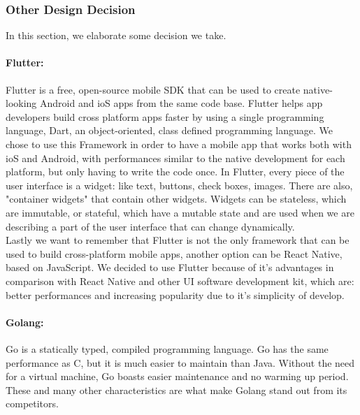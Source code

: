 \subsubsection{Other Design Decision}
In this section, we elaborate some decision we take.\newline\newline
\paragraph{ Flutter:} Flutter is a free, open-source mobile SDK that can be used to create native-looking Android and ioS apps from the same code base. Flutter helps
app developers build cross platform apps faster by using a single programming language, Dart, an object-oriented, class defined programming language. We chose to use this Framework in order to have a mobile app that works both with ioS and Android, with performances similar to the native development for each platform, but only having to write the code once. In Flutter, every piece of the user interface is a widget: like text, buttons, check boxes, images. There are also, "container widgets" that contain other widgets. Widgets can be stateless, which are immutable, or stateful, which have a mutable state and are used when we are describing a part of the user interface that can change dynamically.\\
Lastly we want to remember that Flutter is not the only framework that can be used to build cross-platform mobile apps, another option can be React Native, based on JavaScript. We decided to use Flutter because of it's advantages in comparison with React Native and other UI software development kit, which are: better performances and increasing popularity due to it's simplicity of develop.\\
\paragraph{ Golang:} Go is a statically typed, compiled programming language. Go has the same performance as C, but it is much easier to maintain than Java. Without the need for a virtual machine, Go boasts easier maintenance and no warming up period. These and many other characteristics are what make Golang stand out from its competitors.
